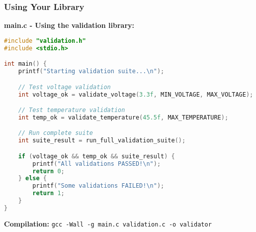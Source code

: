 \documentclass{beamer}
\begin{document}
\begin{frame}[fragile]
\frametitle{Using Your Library}
\textbf{main.c - Using the validation library:}
\begin{lstlisting}[language=C]
#include "validation.h"
#include <stdio.h>

int main() {
    printf("Starting validation suite...\n");

    // Test voltage validation
    int voltage_ok = validate_voltage(3.3f, MIN_VOLTAGE, MAX_VOLTAGE);

    // Test temperature validation
    int temp_ok = validate_temperature(45.5f, MAX_TEMPERATURE);

    // Run complete suite
    int suite_result = run_full_validation_suite();

    if (voltage_ok && temp_ok && suite_result) {
        printf("All validations PASSED!\n");
        return 0;
    } else {
        printf("Some validations FAILED!\n");
        return 1;
    }
}
\end{lstlisting}

\textbf{Compilation:}
\texttt{gcc -Wall -g main.c validation.c -o validator}
\end{frame}
\end{document}
